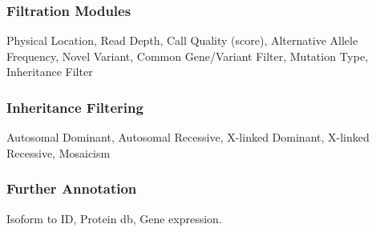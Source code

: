 

\subsubsection{Filtration Modules}


Physical Location, Read Depth, Call Quality (score), Alternative Allele Frequency, Novel Variant, Common Gene/Variant Filter, Mutation Type, Inheritance Filter

\subsubsection{Inheritance Filtering}

Autosomal Dominant, Autosomal Recessive, X-linked Dominant, X-linked Recessive, Mosaicism


\subsubsection{Further Annotation}

Isoform to ID, Protein db, Gene expression.
